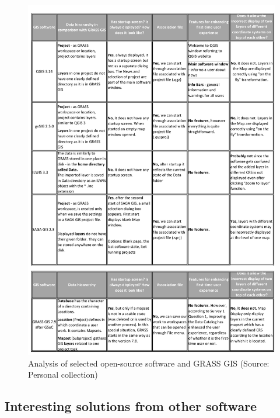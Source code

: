 \documentclass[a4paper,10pt,twoside]{article}
\begin{document}
\vspace{0.3cm}
\begin{figure}[hbt!] 
\begin{center}
\includegraphics[width=15cm]{../pictures/open-source_software.pdf} 
\caption[Analysis of selected open-source software and GRASS GIS]{Analysis of selected open-source software and GRASS GIS (Source: Personal collection)}
\label{fig:open-source_software}
\end{center}
\end{figure}


\newpage
\vspace*{-1cm} 
\subsection{Interesting solutions from other software}
\label{sec:other_software}
\end{document}
